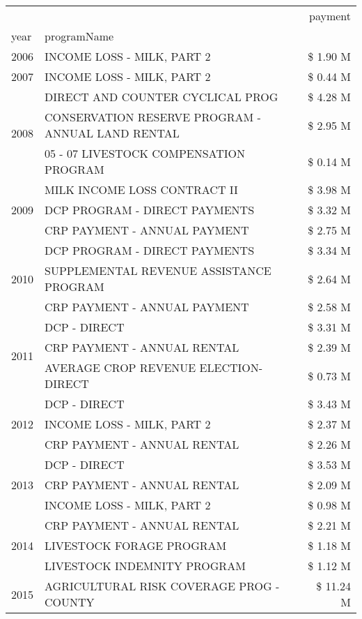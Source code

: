 \begin{tabular}{llr}
\toprule
 &  & payment \\
year & programName &  \\
\midrule
2006 & INCOME LOSS - MILK, PART 2 & \$ 1.90 M \\
\cline{1-3}
2007 & INCOME LOSS - MILK, PART 2 & \$ 0.44 M \\
\cline{1-3}
\multirow[t]{3}{*}{2008} & DIRECT AND COUNTER CYCLICAL PROG & \$ 4.28 M \\
 & CONSERVATION RESERVE PROGRAM - ANNUAL LAND RENTAL & \$ 2.95 M \\
 & 05 - 07 LIVESTOCK COMPENSATION PROGRAM & \$ 0.14 M \\
\cline{1-3}
\multirow[t]{3}{*}{2009} & MILK INCOME LOSS CONTRACT II & \$ 3.98 M \\
 & DCP PROGRAM - DIRECT PAYMENTS & \$ 3.32 M \\
 & CRP PAYMENT - ANNUAL PAYMENT & \$ 2.75 M \\
\cline{1-3}
\multirow[t]{3}{*}{2010} & DCP PROGRAM - DIRECT PAYMENTS & \$ 3.34 M \\
 & SUPPLEMENTAL REVENUE ASSISTANCE PROGRAM & \$ 2.64 M \\
 & CRP PAYMENT - ANNUAL PAYMENT & \$ 2.58 M \\
\cline{1-3}
\multirow[t]{3}{*}{2011} & DCP - DIRECT & \$ 3.31 M \\
 & CRP PAYMENT - ANNUAL RENTAL & \$ 2.39 M \\
 & AVERAGE CROP REVENUE ELECTION-DIRECT & \$ 0.73 M \\
\cline{1-3}
\multirow[t]{3}{*}{2012} & DCP - DIRECT & \$ 3.43 M \\
 & INCOME LOSS - MILK, PART 2 & \$ 2.37 M \\
 & CRP PAYMENT - ANNUAL RENTAL & \$ 2.26 M \\
\cline{1-3}
\multirow[t]{3}{*}{2013} & DCP - DIRECT & \$ 3.53 M \\
 & CRP PAYMENT - ANNUAL RENTAL & \$ 2.09 M \\
 & INCOME LOSS - MILK, PART 2 & \$ 0.98 M \\
\cline{1-3}
\multirow[t]{3}{*}{2014} & CRP PAYMENT - ANNUAL RENTAL & \$ 2.21 M \\
 & LIVESTOCK FORAGE PROGRAM & \$ 1.18 M \\
 & LIVESTOCK INDEMNITY PROGRAM & \$ 1.12 M \\
\cline{1-3}
\multirow[t]{3}{*}{2015} & AGRICULTURAL RISK COVERAGE PROG - COUNTY & \$ 11.24 M \\

\end{tabular}
